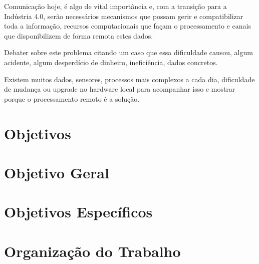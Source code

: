 Comunicação hoje, é algo de vital importância e, com a transição para a Indústria 4.0, serão necessários mecanismos que possam gerir e compatibilizar toda a informação, recursos computacionais que façam o processamento e canais que disponibilizem de forma remota estes dados.

Debater sobre este problema citando um caso que essa dificuldade causou, algum acidente, algum desperdício de dinheiro, ineficiência, dados concretos.

Existem muitos dados, sensores, processos mais complexos a cada dia, dificuldade de mudança ou upgrade no hardware local para acompanhar isso e mostrar porque o processamento remoto é a solução.

\section{Objetivos}
\label{sec:objetivos}

\section{Objetivo Geral}
\label{sec:objetivo-geral}

\section{Objetivos Específicos}
\label{sec:objetivos-especificos}

\section{Organização do Trabalho}
\label{sec:organizacao-trabalho}
